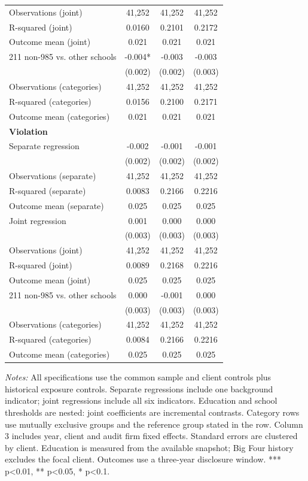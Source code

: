 \documentclass[10pt]{article}
\begin{document}
\begin{minipage}{19cm}
\begin{threeparttable}
\begin{tabular}{p{}ccc}
Observations (joint) & 41,252 & 41,252 & 41,252 \\
R-squared (joint) & 0.0160 & 0.2101 & 0.2172 \\
Outcome mean (joint) & 0.021 & 0.021 & 0.021 \\
211 non-985 vs. other schools & -0.004* & -0.003 & -0.003 \\
 & (0.002) & (0.002) & (0.003) \\
Observations (categories) & 41,252 & 41,252 & 41,252 \\
R-squared (categories) & 0.0156 & 0.2100 & 0.2171 \\
Outcome mean (categories) & 0.021 & 0.021 & 0.021 \\
\multicolumn{4}{l}{\textbf{Violation}} \\
Separate regression & -0.002 & -0.001 & -0.001 \\
 & (0.002) & (0.002) & (0.002) \\
Observations (separate) & 41,252 & 41,252 & 41,252 \\
R-squared (separate) & 0.0083 & 0.2166 & 0.2216 \\
Outcome mean (separate) & 0.025 & 0.025 & 0.025 \\
Joint regression & 0.001 & 0.000 & 0.000 \\
 & (0.003) & (0.003) & (0.003) \\
Observations (joint) & 41,252 & 41,252 & 41,252 \\
R-squared (joint) & 0.0089 & 0.2168 & 0.2216 \\
Outcome mean (joint) & 0.025 & 0.025 & 0.025 \\
211 non-985 vs. other schools & 0.000 & -0.001 & 0.000 \\
 & (0.003) & (0.003) & (0.003) \\
Observations (categories) & 41,252 & 41,252 & 41,252 \\
R-squared (categories) & 0.0084 & 0.2166 & 0.2216 \\
Outcome mean (categories) & 0.025 & 0.025 & 0.025 \\
\bottomrule
\end{tabular}
\begin{tablenotes}\fontsize{9}{11}\selectfont
\item \raggedright \fontsize{9}{11}\selectfont \textit{Notes:} All specifications use the common sample and client controls plus historical exposure controls. Separate regressions include one background indicator; joint regressions include all six indicators. Education and school thresholds are nested: joint coefficients are incremental contrasts. Category rows use mutually exclusive groups and the reference group stated in the row. Column 3 includes year, client and audit firm fixed effects. Standard errors are clustered by client. Education is measured from the available snapshot; Big Four history excludes the focal client. Outcomes use a three-year disclosure window. *** p<0.01, ** p<0.05, * p<0.1.
\end{tablenotes}
\end{threeparttable}

\end{minipage}
\end{document}
